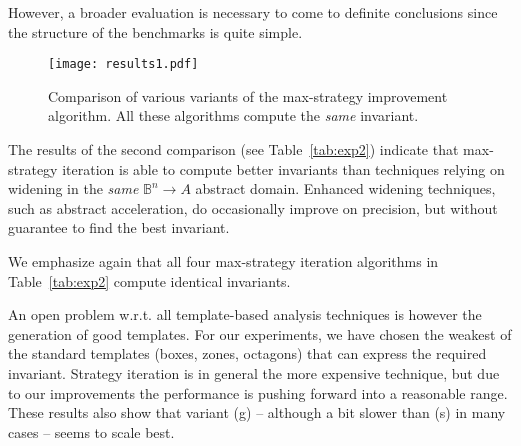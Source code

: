 \documentclass{llncs}
\newcommand{\rronly}[1]{#1}
\newcommand{\BB}{\mathbb{B}}
\begin{document}
\rronly{
However, a broader evaluation is necessary to come to definite
conclusions since the structure of the benchmarks is quite simple.
}

\begin{figure}[t]
\centering
\vspace*{-4ex}
\texttt{[image: results1.pdf]}
\vspace*{-5ex}
\caption{\label{fig:exp1}
Comparison of various variants of the max-strategy improvement
algorithm. All these algorithms compute the \emph{same} invariant. 
}
\end{figure}


The results of the second comparison (see Table~\ref{tab:exp2})
indicate that max-strategy iteration is able to compute
better invariants than techniques relying on widening in the \emph{same}
$\BB^n \rightarrow A$ abstract domain.
Enhanced widening techniques, such as abstract acceleration, do
occasionally improve on precision, but without guarantee to find
the best invariant. 

We emphasize again that all four max-strategy iteration algorithms in
Table~\ref{tab:exp2} compute identical invariants.

An open problem w.r.t. all template-based analysis techniques is
however the generation of good templates.  For our experiments, we
have chosen the weakest of the standard templates (boxes, zones,
octagons) that can express the required invariant.
Strategy iteration is in general the more expensive technique, but due
to our improvements the performance is pushing forward into a
reasonable range.  These results also show that variant (g) --
although a bit slower than (s) in many cases -- seems to scale best.
\end{document}
